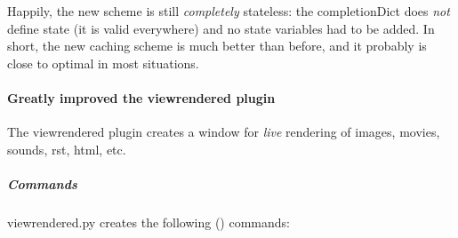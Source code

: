 \documentclass[a4paper,10pt,english]{sphinxmanual}
\begin{document}
Happily, the new scheme is still \emph{completely} stateless: the completionDict does
\emph{not} define state (it is valid everywhere) and no state variables had to be
added. In short, the new caching scheme is much better than before, and it
probably is close to optimal in most situations.


\paragraph{Greatly improved the viewrendered plugin}
\label{what-is-new:greatly-improved-the-viewrendered-plugin}
The viewrendered plugin creates a window for \emph{live} rendering of images, movies,
sounds, rst, html, etc.


\subparagraph{Commands}
\label{what-is-new:commands}
viewrendered.py creates the following () commands:
\end{document}
